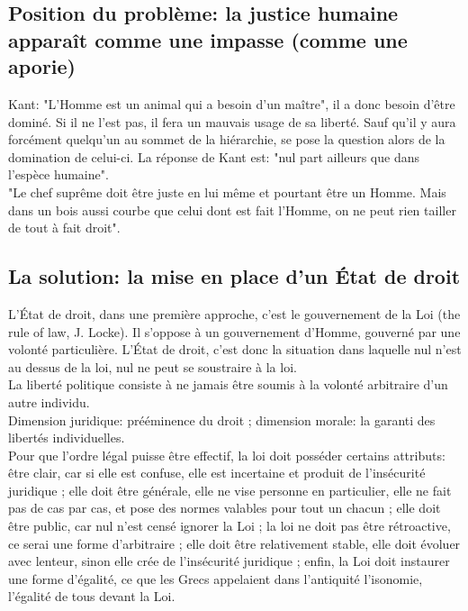 \documentclass[10pt, a4paper, openany]{book}
\begin{document}
\subsection{Position du problème: la justice humaine apparaît comme une impasse (comme une aporie)}

Kant: "L'Homme est un animal qui a besoin d'un maître", il a donc besoin d'être dominé. Si il ne l'est pas, il fera un mauvais usage de sa liberté. Sauf qu'il y aura forcément quelqu'un au sommet de la hiérarchie, se pose la question alors de la domination de celui-ci. La réponse de Kant est: "nul part ailleurs que dans l'espèce humaine". \\
"Le chef suprême doit être juste en lui même et pourtant être un Homme. Mais dans un bois aussi courbe que celui dont est fait l'Homme, on ne peut rien tailler de tout à fait droit". 

\subsection{La solution: la mise en place d'un État de droit}

L'État de droit, dans une première approche, c'est le gouvernement de la Loi (the rule of law, J. Locke). Il s'oppose à un gouvernement d'Homme, gouverné par une volonté particulière. L'État de droit, c'est donc la situation dans laquelle nul n'est au dessus de la loi, nul ne peut se soustraire à la loi. \\
La liberté politique consiste à ne jamais être soumis à la volonté arbitraire d'un autre individu. \\
Dimension juridique: prééminence du droit ; dimension morale: la garanti des libertés individuelles. \\
Pour que l'ordre légal puisse être effectif, la loi doit posséder certains attributs: être clair, car si elle est confuse, elle est incertaine et produit de l'insécurité juridique ; elle doit être générale, elle ne vise personne en particulier, elle ne fait pas de cas par cas, et pose des normes valables pour tout un chacun ; elle doit être public, car nul n'est censé ignorer la Loi ; la loi ne doit pas être rétroactive, ce serai une forme d'arbitraire ; elle doit être relativement stable, elle doit évoluer avec lenteur, sinon elle crée de l'insécurité juridique ; enfin, la Loi doit instaurer une forme d'égalité, ce que les Grecs appelaient dans l'antiquité l'isonomie, l'égalité de tous devant la Loi. 
\end{document}
